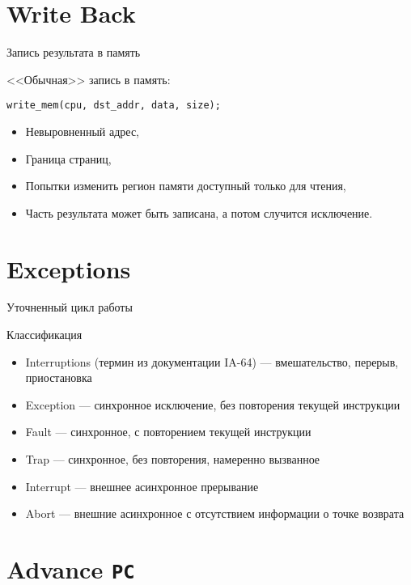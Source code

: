 \section{Write Back}

\begin{frame}{Запись результата в память}

<<Обычная>> запись в память:

\texttt{write_mem(cpu, dst_addr, data, size);}\pause

\pause

\begin{itemize}
    \item Невыровненный адрес,
    \item Граница страниц,
    \item Попытки изменить регион памяти доступный только для чтения,
    \item Часть результата может быть записана, а потом случится исключение.
\end{itemize}

\end{frame}

\section{Exceptions}

\begin{frame}{Уточненный цикл работы}
\centering
{}
\end{frame}

\begin{frame}{Классификация} %
\begin{itemize}
\item Interruptions (термин из документации IA-64) — вмешательство, перерыв, приостановка
\item Exception — синхронное исключение, без повторения текущей инструкции
\item Fault — синхронное, с повторением текущей инструкции
\item Trap — синхронное, без повторения, намеренно вызванное
\item Interrupt — внешнее асинхронное прерывание
\item Abort — внешние асинхронное с отсутствием информации о точке возврата
\end{itemize}
\end{frame}

\section{Advance \texttt{PC}}

